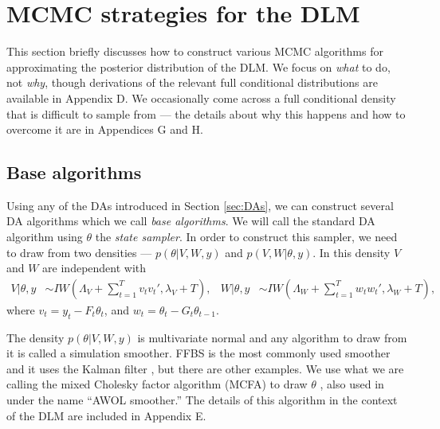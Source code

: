 \documentclass[12pt]{article}
\begin{document}
\section{MCMC strategies for the DLM}\label{sec:Algs}

This section briefly discusses how to construct various MCMC algorithms for approximating the posterior distribution of the DLM. We focus on {\it what} to do, not {\it why}, though derivations of the relevant full conditional distributions are available in Appendix D. We occasionally come across a full conditional density that is difficult to sample from --- the details about why this happens and how to overcome it are in Appendices G and H.

\subsection{Base algorithms}\label{sec:Algs:base}
Using any of the DAs introduced in Section \ref{sec:DAs}, we can construct several DA algorithms which we call {\it base algorithms}. We will call the standard DA algorithm using $\theta$ the {\it state sampler}. In order to construct this sampler, we need to draw from two densities --- $p(\theta|V,W,y)$ and $p(V,W|\theta,y)$. In this density $V$ and $W$ are independent with
\begin{align*}
  V|\theta,y &\sim IW\left(\Lambda_V + \sum_{t=1}^Tv_tv_t',\lambda_V + T\right), &
  W|\theta,y &\sim IW\left(\Lambda_W + \sum_{t=1}^Tw_tw_t',\lambda_{W} + T\right), %
\end{align*}
where $v_t = y_t - F_t\theta_t$, and $w_t = \theta_t - G_t\theta_{t-1}$. 

The density $p(\theta|V,W,y)$ is multivariate normal and any algorithm to draw from it is called a simulation smoother. FFBS is the most commonly used smoother and it uses the Kalman filter \citep{fruhwirth1994data,carter1994gibbs}, but there are other examples.
We use what we are calling the mixed Cholesky factor algorithm (MCFA) to draw $\theta$ \citep{mccausland2011simulation}, also used in \citet{kastner2013ancillarity} under the name ``AWOL smoother.'' The details of this algorithm in the context of the DLM are included in Appendix E.
\end{document}
